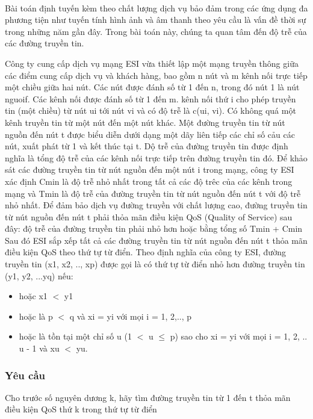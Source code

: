 

 

Bài toán định tuyến kèm theo chất lượng dịch vụ bảo đảm trong các ứng dụng đa phương tiện như tuyến tính hình ảnh và âm thanh theo yêu cầu là vấn đề thời sự trong những năm gần đây. Trong bài toán này, chúng ta quan tâm đến độ trễ của các đường truyền tin.

Công ty cung cấp dịch vụ mạng ESI vừa thiết lập một mạng truyền thông giữa các điểm cung cấp dịch vụ và khách hàng, bao gồm n nút và m kênh nối trực tiếp một chiều giữa hai nút. Các nút được đánh số từ 1 đến n, trong đó nút 1 là nút nguoif. Các kênh nối được đánh số từ 1 đến m. kênh nối thứ i cho phép truyền tin (một chiều) từ nút ui tới nút vi và có độ trễ là c(ui, vi). Có không quá một kênh truyền tin từ một nút đến một nút khác. Một đường truyền tin từ nút nguồn đến nút t được biểu diễn dưới dạng một dãy liên tiếp các chỉ số cảu các nút, xuất phát từ 1 và kết thúc tại t. Dộ trễ của đường truyền tin được định nghĩa là tổng độ trễ của các kênh nối trực tiếp trên đường truyền tin đó. Để khảo sát các đường truyền tin từ nút nguồn đến một nút i trong mạng, công ty ESI xác định Cmin là độ trễ nhỏ nhất trong tất cả các độ trêc của các kênh trong mạng và Tmin là độ trễ của đường truyền tin từ nút nguồn đến nút t với độ trễ nhỏ nhất. Để đảm bảo dịch vụ đường truyền với chất lượng cao, đường truyền tin từ nút nguồn đến nút t phải thỏa mãn điều kiện QoS (Quality of Service) sau đây: độ trễ của đường truyền tin phải nhỏ hơn hoặc bằng tổng số Tmin + Cmin Sau đó ESI sắp xếp tất cả các đường truyền tin từ nút nguồn đến nút t thỏa mãn điều kiện QoS theo thứ tự từ điển. Theo định nghĩa của công ty ESI, đường truyền tin (x1, x2, .., xp) được gọi là có thứ tự từ điển nhỏ hơn đường truyền tin (y1, y2, ...yq) nếu:
\begin{itemize}
	\item hoặc x1 $<$ y1
	\item hoặc là p $<$ q và xi = yi với mọi i = 1, 2,.., p
	\item hoặc là tồn tại một chỉ số u (1 $<$ u  $\le$  p) sao cho xi = yi với mọi i = 1, 2, .. u - 1 và xu $<$ yu.
\end{itemize}

\subsubsection{Yêu cầu}

Cho trước số nguyên dương k, hãy tìm đường truyền tin từ 1 đến t thỏa mãn điều kiện QoS thứ k trong thứ tự từ điển

